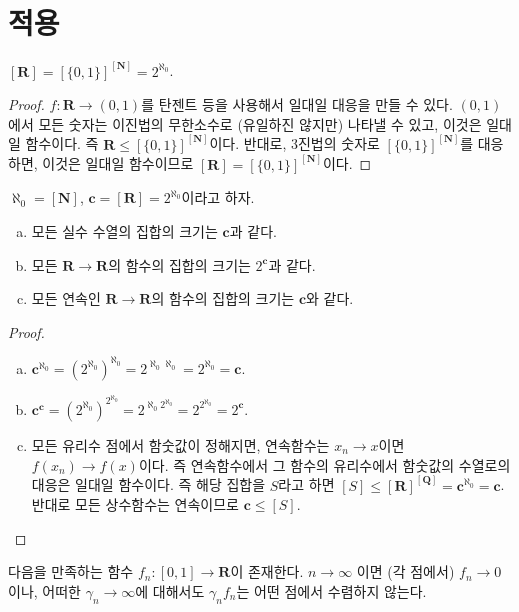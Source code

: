 \section{적용}
\begin{theorem}
	$[\mathbf{R}] = {[\{0, 1\}]}^{[\mathbf{N}]} = 2^{\aleph_0}$.
\end{theorem}
\begin{proof}
	$f : \mathbf{R} \to (0, 1)$를 탄젠트 등을 사용해서 일대일 대응을 만들 수 있다.
	$(0, 1)$에서 모든 숫자는 이진법의 무한소수로 (유일하진 않지만) 나타낼 수 있고, 이것은 일대일 함수이다.
	즉 $\mathbf{R} \leq {[\{0, 1\}]}^{[\mathbf{N}]}$이다.
	반대로, 3진법의 숫자로 ${[\{0, 1\}]}^{[\mathbf{N}]}$를 대응하면, 이것은 일대일 함수이므로 $[\mathbf{R}] = {[\{0, 1\}]}^{[\mathbf{N}]}$이다.
\end{proof}
\begin{theorem}
	$\aleph_0 = [\mathbf{N}]$, $\mathbf{c} = [\mathbf{R}] = 2^{\aleph_0}$이라고 하자.
	\begin{enumerate}[(a)]
		\item 모든 실수 수열의 집합의 크기는 $\mathbf{c}$과 같다.
		\item 모든 $\mathbf{R} \to \mathbf{R}$의 함수의 집합의 크기는 $2^\mathbf{c}$과 같다.
		\item 모든 연속인 $\mathbf{R} \to \mathbf{R}$의 함수의 집합의 크기는 $\mathbf{c}$와 같다.
	\end{enumerate}
\end{theorem}
\begin{proof}
	\begin{enumerate}[(a)]
		\item ${\mathbf{c}}^{\aleph_0} = {\left(2^{\aleph_0}\right)}^{\aleph_0} = 2^{\aleph_0 \aleph_0} = 2^{\aleph_0} = \mathbf{c}$.
		\item ${\mathbf{c}}^{\mathbf{c}} = {(2^{\aleph_0})}^{2^{\aleph_0}} = 2^{\aleph_0 2^{\aleph_0}} = 2^{2^{\aleph_0}} = 2^{\mathbf{c}}$.
		\item 모든 유리수 점에서 함숫값이 정해지면, 연속함수는 $x_n \to x$이면 $f(x_n) \to f(x)$이다.
		즉 연속함수에서 그 함수의 유리수에서 함숫값의 수열로의 대응은 일대일 함수이다.
		즉 해당 집합을 $S$라고 하면 $[S] \leq {[\mathbf{R}]}^{[\mathbf{Q}]} = \mathbf{c}^{\aleph_0} = \mathbf{c}$.
		반대로 모든 상수함수는 연속이므로 $\mathbf{c} \leq [S]$.
	\end{enumerate}
\end{proof}
\begin{theorem}
	다음을 만족하는 함수 $f_n : [0, 1] \to \mathbf{R}$이 존재한다.
	$n \to \infty$ 이면 (각 점에서) $f_n \to 0$이나, 어떠한 $\gamma_n \to \infty$에 대해서도 $\gamma_n f_n$는 어떤 점에서 수렴하지 않는다.
\end{theorem}
